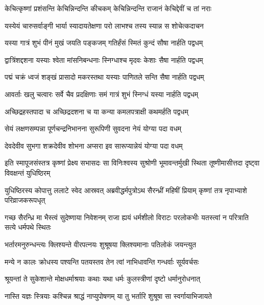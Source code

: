 \twolineshloka
{केचित्कृष्णां प्रशंसन्ति केचिन्निन्दन्ति कीचकम्}
{केचिन्निन्दन्ति राजानं केचिद्देवीं च तां नराः}




\twolineshloka
{यस्येयं चारुसर्वाङ्गी भार्या स्यादायतेक्षणा}
{परो लाभश्च तस्य स्यान्न स शोचेत्कदाचन}


\twolineshloka
{यस्या गात्रं शुभं पीनं मुखं जयति पङ्कजम्}
{गतिर्हंसं स्मितं कुन्दं सौषा नार्हति पद्वधम्}


\twolineshloka
{द्वात्रिंशद्दशना यस्याः श्वेता मांसनिबन्धनाः}
{स्निग्धाश्च मृदवः केशाः सैषा नार्हति पद्वधम्}


\twolineshloka
{पद्मं चक्रं ध्वजं शङ्खं प्रासादो मकरस्तथा}
{यस्याः पाणितले सन्ति सैषा नार्हति पद्वधम्}


\twolineshloka
{आवर्ताः खलु चत्वारः सर्वे चैव प्रदक्षिणाः}
{समं गात्रं शुभं स्निग्धं यस्या नार्हति पद्वधम्}


\twolineshloka
{अच्छिद्रहस्तपादा च अच्छिद्रदशना च या}
{कन्या कमलपत्राक्षी कथमर्हति पद्वधम्}


\twolineshloka
{सेयं लक्षणसम्पन्ना पूर्णचन्द्रनिभानना}
{सुरूपिणी सुवदना नेयं योग्या पदा वधम्}


\twolineshloka
{देवदेवीव सुभगा शक्रदेवीव शोभना}
{अप्सरा इव सारूप्यान्नेयं योग्या पदा वधम्}


\onelineshloka
{इति स्मापूजसंस्तत्र कृष्णां प्रेक्ष्य सभासदः}
\twolineshloka
{सा विनिःश्वस्य सुश्रोणी भूमावन्तर्मुखी स्थिता}
{तूष्णीमासीत्तदा दृष्ट्वा विवक्षन्तं युधिष्ठिरम्}


\threelineshloka
{युधिष्ठिरस्य कोपात्तु ललाटे स्वेद आस्रवत्}
{अब्रवीद्धर्मपुत्रोऽथ सैरन्ध्रीं महिषीं प्रियाम्}
{कृष्णां तत्र नृपाभ्याशे परिव्राजकरूपधृत्}


\threelineshloka
{गच्छ सैरन्ध्रि मा भैस्त्वं सुदेष्णाया निवेशनम्}
{राजा ह्ययं धर्मशीलो विराटः परलोकभीः}
{यतस्त्वां न परित्राति सत्ये धर्मपथे स्थितः}


\twolineshloka
{भर्तारमनुरुन्धन्त्यः क्लिश्यन्ते वीरपत्नयः}
{शुश्रूषया क्लिश्यमानाः पतिलोकं जयन्त्युत}


\twolineshloka
{मन्ये न कालः क्रोधस्य पश्यन्ति पतयस्तव}
{तेन त्वां नाभिधावन्ति गन्धर्वाः सूर्यवर्चसः}


\twolineshloka
{श्रूयन्तां ते सुकेशान्ते मोक्षधर्माश्रयाः कथाः}
{यथा धर्मः कुलस्त्रीणां दृष्टो धर्मानुरोधनात्}


\twolineshloka
{नास्ति यज्ञः स्त्रियाः कश्चिन्न श्राद्धं नाप्युपोषणम्}
{या तु भर्तारि शुश्रूषा सा स्वर्गायाभिजायते}


